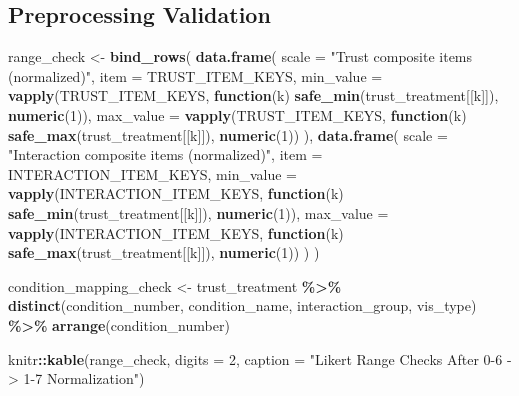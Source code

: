 \documentclass[
]{article}
\newenvironment{Shaded}{\begin{snugshade}}{\end{snugshade}}
\newcommand{\AttributeTok}[1]{\textcolor[rgb]{0.13,0.29,0.53}{#1}}
\newcommand{\ControlFlowTok}[1]{\textcolor[rgb]{0.13,0.29,0.53}{\textbf{#1}}}
\newcommand{\DecValTok}[1]{\textcolor[rgb]{0.00,0.00,0.81}{#1}}
\newcommand{\FunctionTok}[1]{\textcolor[rgb]{0.13,0.29,0.53}{\textbf{#1}}}
\newcommand{\NormalTok}[1]{#1}
\newcommand{\OtherTok}[1]{\textcolor[rgb]{0.56,0.35,0.01}{#1}}
\newcommand{\SpecialCharTok}[1]{\textcolor[rgb]{0.81,0.36,0.00}{\textbf{#1}}}
\newcommand{\StringTok}[1]{\textcolor[rgb]{0.31,0.60,0.02}{#1}}
\begin{document}
\subsection{Preprocessing Validation}\label{preprocessing-validation}

\begin{Shaded}
\begin{Highlighting}[]
\NormalTok{range\_check }\OtherTok{\textless{}{-}} \FunctionTok{bind\_rows}\NormalTok{(}
  \FunctionTok{data.frame}\NormalTok{(}
    \AttributeTok{scale =} \StringTok{"Trust composite items (normalized)"}\NormalTok{,}
    \AttributeTok{item =}\NormalTok{ TRUST\_ITEM\_KEYS,}
    \AttributeTok{min\_value =} \FunctionTok{vapply}\NormalTok{(TRUST\_ITEM\_KEYS, }\ControlFlowTok{function}\NormalTok{(k) }\FunctionTok{safe\_min}\NormalTok{(trust\_treatment[[k]]), }\FunctionTok{numeric}\NormalTok{(}\DecValTok{1}\NormalTok{)),}
    \AttributeTok{max\_value =} \FunctionTok{vapply}\NormalTok{(TRUST\_ITEM\_KEYS, }\ControlFlowTok{function}\NormalTok{(k) }\FunctionTok{safe\_max}\NormalTok{(trust\_treatment[[k]]), }\FunctionTok{numeric}\NormalTok{(}\DecValTok{1}\NormalTok{))}
\NormalTok{  ),}
  \FunctionTok{data.frame}\NormalTok{(}
    \AttributeTok{scale =} \StringTok{"Interaction composite items (normalized)"}\NormalTok{,}
    \AttributeTok{item =}\NormalTok{ INTERACTION\_ITEM\_KEYS,}
    \AttributeTok{min\_value =} \FunctionTok{vapply}\NormalTok{(INTERACTION\_ITEM\_KEYS, }\ControlFlowTok{function}\NormalTok{(k) }\FunctionTok{safe\_min}\NormalTok{(trust\_treatment[[k]]), }\FunctionTok{numeric}\NormalTok{(}\DecValTok{1}\NormalTok{)),}
    \AttributeTok{max\_value =} \FunctionTok{vapply}\NormalTok{(INTERACTION\_ITEM\_KEYS, }\ControlFlowTok{function}\NormalTok{(k) }\FunctionTok{safe\_max}\NormalTok{(trust\_treatment[[k]]), }\FunctionTok{numeric}\NormalTok{(}\DecValTok{1}\NormalTok{))}
\NormalTok{  )}
\NormalTok{)}

\NormalTok{condition\_mapping\_check }\OtherTok{\textless{}{-}}\NormalTok{ trust\_treatment }\SpecialCharTok{\%\textgreater{}\%}
  \FunctionTok{distinct}\NormalTok{(condition\_number, condition\_name, interaction\_group, vis\_type) }\SpecialCharTok{\%\textgreater{}\%}
  \FunctionTok{arrange}\NormalTok{(condition\_number)}

\NormalTok{knitr}\SpecialCharTok{::}\FunctionTok{kable}\NormalTok{(range\_check, }\AttributeTok{digits =} \DecValTok{2}\NormalTok{, }\AttributeTok{caption =} \StringTok{"Likert Range Checks After 0{-}6 {-}\textgreater{} 1{-}7 Normalization"}\NormalTok{)}
\end{Highlighting}
\end{Shaded}
\end{document}
